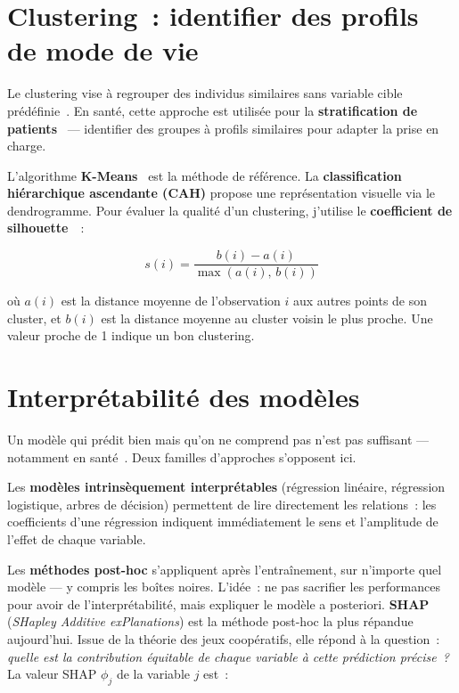 \section{Clustering~: identifier des profils de mode de vie}

Le clustering vise à regrouper des individus similaires sans variable cible prédéfinie~\cite{macqueen1967}. En santé, cette approche est utilisée pour la \textbf{stratification de patients}~\cite{booth2012} --- identifier des groupes à profils similaires pour adapter la prise en charge.

L'algorithme \textbf{K-Means}~\cite{macqueen1967} est la méthode de référence. La \textbf{classification hiérarchique ascendante (CAH)} propose une représentation visuelle via le dendrogramme. Pour évaluer la qualité d'un clustering, j'utilise le \textbf{coefficient de silhouette}~\cite{rousseeuw1987}~:

\begin{equation}
s(i) = \frac{b(i) - a(i)}{\max(a(i),\, b(i))}
\end{equation}

où $a(i)$ est la distance moyenne de l'observation $i$ aux autres points de son cluster, et $b(i)$ est la distance moyenne au cluster voisin le plus proche. Une valeur proche de 1 indique un bon clustering.

\section{Interprétabilité des modèles}

Un modèle qui prédit bien mais qu'on ne comprend pas n'est pas suffisant --- notamment en santé~\cite{rudin2019}. Deux familles d'approches s'opposent ici.

Les \textbf{modèles intrinsèquement interprétables} (régression linéaire, régression logistique, arbres de décision) permettent de lire directement les relations~: les coefficients d'une régression indiquent immédiatement le sens et l'amplitude de l'effet de chaque variable.

Les \textbf{méthodes post-hoc} s'appliquent après l'entraînement, sur n'importe quel modèle --- y compris les boîtes noires. L'idée~: ne pas sacrifier les performances pour avoir de l'interprétabilité, mais expliquer le modèle a posteriori. \textbf{SHAP}~\cite{lundberg2017} (\textit{SHapley Additive exPlanations}) est la méthode post-hoc la plus répandue aujourd'hui. Issue de la théorie des jeux coopératifs, elle répond à la question~: \textit{quelle est la contribution équitable de chaque variable à cette prédiction précise~?} La valeur SHAP $\phi_j$ de la variable $j$ est~:

